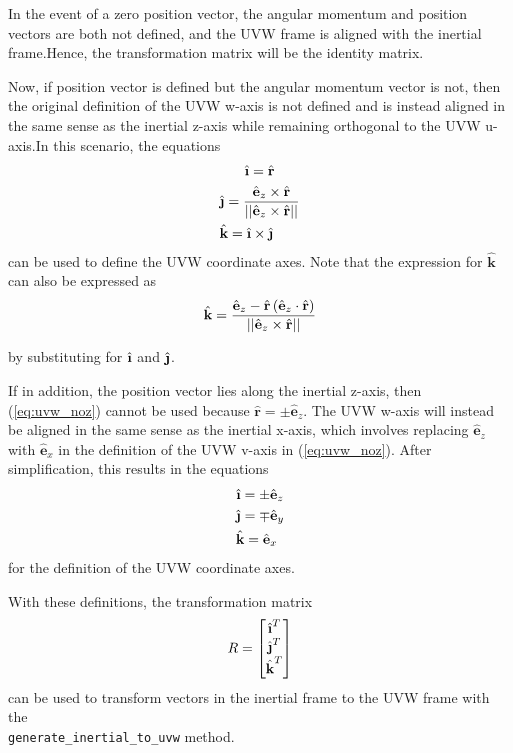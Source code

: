\documentclass[11pt,fleqn]{report}
\begin{document}
In the event of a zero position vector, the angular momentum and position
vectors are both not defined, and the UVW frame is aligned with the inertial
frame.Hence, the transformation matrix will be the identity matrix.

Now, if position vector is defined but the angular momentum vector is not,
then the original definition of the UVW w-axis is not defined and is
instead aligned in the same sense as the inertial z-axis while remaining
orthogonal to the UVW u-axis.In this scenario, the equations
\begin{multline}
 \hat{\textbf{\i}} = \hat{\textbf{r}} \\
 \hat{\textbf{\j}} = \frac{\hat{\textbf{e}}_z \times \hat{\textbf{r}}}
{||\hat{\textbf{e}}_z \times \hat{\textbf{r}}||} \\
 \hat{\textbf{k}} = \hat{\textbf{\i}} \times \hat{\textbf{\j}} \hfill
 \label{eq:uvw_noz}
\end{multline}
can be used to define the UVW coordinate axes.
Note that the expression for $\hat{\textbf{k}}$ can also be expressed as
\begin{equation}
 \hfill \hat{\textbf{k}} =
 \frac{ \hat{\textbf{e}}_z -
\hat{\textbf{r}}
\left( \hat{\textbf{e}}_z \cdot \hat{\textbf{r}} \right)}
{||\hat{\textbf{e}}_z \times \hat{\textbf{r}}||} \hfill
\end{equation}

by substituting for $\hat{\textbf{\i}}$ and $\hat{\textbf{\j}}$.

If in addition, the position vector lies along the inertial z-axis, then
(\ref{eq:uvw_noz}) cannot be used because
$\hat{\textbf{r}}= \pm \hat{\textbf{e}}_z$.
The UVW w-axis will instead be aligned in the same sense as the inertial
x-axis, which involves replacing $\hat{\textbf{e}}_z$ with
$\hat{\textbf{e}}_x$
in the definition of the UVW v-axis in (\ref{eq:uvw_noz}). After
simplification, this results in the equations
\begin{multline}
 \hat{\textbf{\i}} = \pm \hat{\textbf{e}}_z \\
 \hat{\textbf{\j}} = \mp \hat{\textbf{e}}_y \\
 \hat{\textbf{k}} = \hat{\textbf{e}}_x \hfill
 \label{eq:uvw_z}
\end{multline}
for the definition of the UVW coordinate axes.

With these definitions, the transformation matrix
\begin{equation}
 \hfill R = \begin{bmatrix} \hat{\textbf{\i}}^T \\
\hat{\textbf{\j}}^T \\
\hat{\textbf{k}}^T
\end{bmatrix} \hfill
 \label{eq:uvw_mat}
\end{equation}
can be used to transform vectors in the inertial frame to the UVW frame
with the \\ \texttt{generate\_inertial\_to\_uvw} method.
\end{document}
